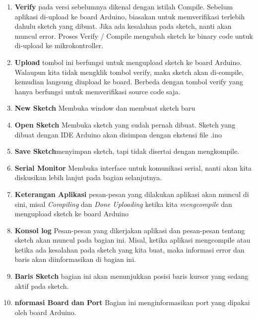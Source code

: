 \begin{enumerate}
    \item \textbf{Verify} pada versi sebelumnya dikenal dengan istilah Compile. Sebelum aplikasi di-upload ke board Arduino, biasakan untuk memverifikasi terlebih dahulu sketch yang dibuat. Jika ada kesalahan pada sketch, nanti akan muncul error. Proses Verify / Compile mengubah sketch ke binary code untuk di-upload ke mikrokontroller.
    \item \textbf{Upload} tombol ini berfungsi untuk mengupload sketch ke board Arduino. Walaupun kita tidak mengklik tombol verify, maka sketch akan di-compile, kemudian langsung diupload ke board. Berbeda dengan tombol verify yang hanya berfungsi untuk memverifikasi source code saja.
    \item \textbf{New Sketch} Membuka window dan membuat sketch baru
    \item \textbf{Open Sketch} Membuka sketch yang sudah pernah dibuat. Sketch yang dibuat dengan IDE Arduino akan disimpan dengan ekstensi file .ino
    \item \textbf{Save Sketch}menyimpan sketch, tapi tidak disertai dengan mengkompile.
    \item \textbf{Serial Monitor} Membuka interface untuk komunikasi serial, nanti akan kita diskusikan lebih lanjut pada bagian selanjutnya.
    \item \textbf{Keterangan Aplikasi} pesan-pesan yang dilakukan aplikasi akan muncul di sini, misal \textit{Compiling} dan \textit{Done Uploading} ketika kita \textit{mengcompile} dan mengupload sketch ke board Arduino
    \item \textbf{Konsol log} Pesan-pesan yang dikerjakan aplikasi dan pesan-pesan tentang sketch akan muncul pada bagian ini. Misal, ketika aplikasi mengcompile atau ketika ada kesalahan pada sketch yang kita buat, maka informasi error dan baris akan diinformasikan di bagian ini.
    \item \textbf{Baris Sketch} bagian ini akan menunjukkan posisi baris kursor yang sedang aktif pada sketch.
    \item \textbf{nformasi Board dan Port} Bagian ini menginformasikan port yang dipakai oleh board Arduino.
\end{enumerate}


